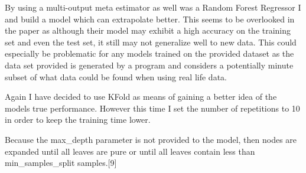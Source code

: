 \documentclass[11pt]{article}
\begin{document}
By using a multi-output meta estimator as well was a Random Forest
Regressor I and build a model which can extrapolate better. This seems
to be overlooked in the paper as although their model may exhibit a high
accuracy on the training set and even the test set, it still may not
generalize well to new data. This could especially be problematic for
any models trained on the provided dataset as the data set provided is
generated by a program and considers a potentially minute subset of what
data could be found when using real life data.

Again I have decided to use KFold as means of gaining a better idea of
the models true performance. However this time I set the number of
repetitions to 10 in order to keep the training time lower.

Because the max\_depth parameter is not provided to the model, then
nodes are expanded until all leaves are pure or until all leaves contain
less than min\_samples\_split samples.{[}9{]}
\end{document}
